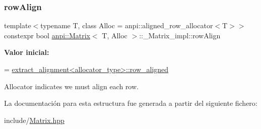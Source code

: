 \subsubsection{\texorpdfstring{row\+Align}{rowAlign}}
{\footnotesize\ttfamily template$<$typename T, class Alloc = anpi\+::aligned\+\_\+row\+\_\+allocator$<$\+T$>$$>$ \\
constexpr bool \hyperlink{classanpi_1_1Matrix}{anpi\+::\+Matrix}$<$ T, Alloc $>$\+::\+\_\+\+Matrix\+\_\+impl\+::row\+Align\hspace{0.3cm}{\ttfamily [static]}}

{\bfseries Valor inicial\+:}
\begin{DoxyCode}
=
        \hyperlink{structanpi_1_1extract__alignment_a4e7985310e7f1be7c2277e665bb62a13}{extract\_alignment<allocator\_type>::row\_aligned}
\end{DoxyCode}


Allocator indicates we must align each row. 



La documentación para esta estructura fue generada a partir del siguiente fichero\+:\begin{DoxyCompactItemize}
\item 
include/\hyperlink{Matrix_8hpp}{Matrix.\+hpp}\end{DoxyCompactItemize}
